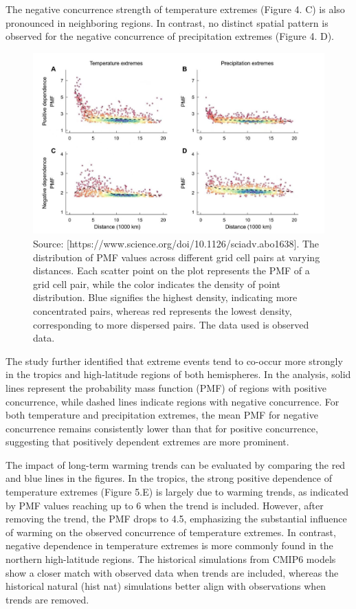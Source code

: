 \documentclass[
]{krantz}
\begin{document}
The negative concurrence strength of temperature extremes (Figure 4. C) is also pronounced in neighboring regions. In contrast, no distinct spatial pattern is observed for the negative concurrence of precipitation extremes (Figure 4. D).

\vspace{1em}
\begin{figure}

{\centering \includegraphics[width=0.8\linewidth]{work/06-anthropo/figures/distance} 

}

\caption{Source: [https://www.science.org/doi/10.1126/sciadv.abo1638]. The distribution of PMF values across different grid cell pairs at varying distances. Each scatter point on the plot represents the PMF of a grid cell pair, while the color indicates the density of point distribution. Blue signifies the highest density, indicating more concentrated pairs, whereas red represents the lowest density, corresponding to more dispersed pairs. The data used is observed data.}\label{fig:unnamed-chunk-8}
\end{figure}
\vspace{1em}

The study further identified that extreme events tend to co-occur more strongly in the tropics and high-latitude regions of both hemispheres. In the analysis, solid lines represent the probability mass function (PMF) of regions with positive concurrence, while dashed lines indicate regions with negative concurrence. For both temperature and precipitation extremes, the mean PMF for negative concurrence remains consistently lower than that for positive concurrence, suggesting that positively dependent extremes are more prominent.

The impact of long-term warming trends can be evaluated by comparing the red and blue lines in the figures. In the tropics, the strong positive dependence of temperature extremes (Figure 5.E) is largely due to warming trends, as indicated by PMF values reaching up to 6 when the trend is included. However, after removing the trend, the PMF drops to 4.5, emphasizing the substantial influence of warming on the observed concurrence of temperature extremes. In contrast, negative dependence in temperature extremes is more commonly found in the northern high-latitude regions. The historical simulations from CMIP6 models show a closer match with observed data when trends are included, whereas the historical natural (hist nat) simulations better align with observations when trends are removed.
\end{document}
